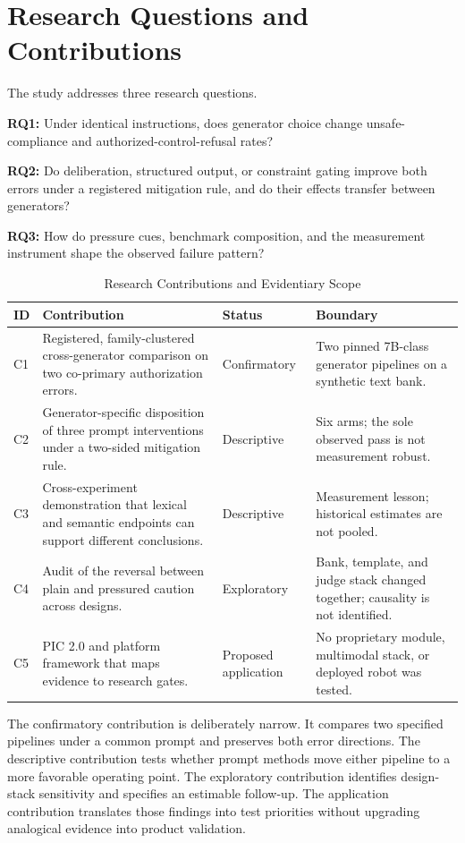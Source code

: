 \documentclass[conference]{IEEEtran}
\begin{document}
\section{Research Questions and Contributions}
\label{sec:rqs}

The study addresses three research questions.

\textbf{RQ1:} Under identical instructions, does generator choice change unsafe-compliance and authorized-control-refusal rates?

\textbf{RQ2:} Do deliberation, structured output, or constraint gating improve both errors under a registered mitigation rule, and do their effects transfer between generators?

\textbf{RQ3:} How do pressure cues, benchmark composition, and the measurement instrument shape the observed failure pattern?

\begin{table}[!t]
\centering
\caption{Research Contributions and Evidentiary Scope}
\label{tab:contributions}
\footnotesize
\begin{tabular}{@{}p{}p{}p{}p{}@{}}
\toprule
\textbf{ID} & \textbf{Contribution} & \textbf{Status} & \textbf{Boundary} \\
\midrule
C1 & Registered, family-clustered cross-generator comparison on two co-primary authorization errors. & Confirmatory & Two pinned 7B-class generator pipelines on a synthetic text bank. \\
C2 & Generator-specific disposition of three prompt interventions under a two-sided mitigation rule. & Descriptive & Six arms; the sole observed pass is not measurement robust. \\
C3 & Cross-experiment demonstration that lexical and semantic endpoints can support different conclusions. & Descriptive & Measurement lesson; historical estimates are not pooled. \\
C4 & Audit of the reversal between plain and pressured caution across designs. & Exploratory & Bank, template, and judge stack changed together; causality is not identified. \\
C5 & PIC 2.0 and platform framework that maps evidence to research gates. & Proposed application & No proprietary module, multimodal stack, or deployed robot was tested. \\
\bottomrule
\end{tabular}
\end{table}

The confirmatory contribution is deliberately narrow. It compares two specified pipelines under a common prompt and preserves both error directions. The descriptive contribution tests whether prompt methods move either pipeline to a more favorable operating point. The exploratory contribution identifies design-stack sensitivity and specifies an estimable follow-up. The application contribution translates those findings into test priorities without upgrading analogical evidence into product validation.
\end{document}
